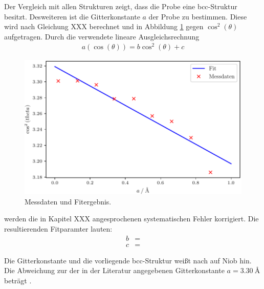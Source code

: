 Der Vergleich mit allen Strukturen zeigt, dass die Probe eine bcc-Struktur besitzt.
Desweiteren ist die Gitterkonstante $a$ der Probe zu bestimmen. Diese wird nach Gleichung XXX berechnet und in Abbildung \ref{fig:plot1} gegen $\cos^2{(\theta)}$ aufgetragen. Durch die verwendete lineare Ausgleichsrechnung
\begin{align}
	a(\cos{(\theta)})= b\cos^2{(\theta)} + c
\end{align}

\begin{figure}
  \centering
  \includegraphics{build/Metall.pdf}
  \caption{Messdaten und Fitergebnis.}
  \label{fig:plot1}
\end{figure}

werden die in Kapitel XXX angesprochenen systematischen Fehler korrigiert. Die resultierenden Fitparamter lauten:
\begin{align}
	b&=  \\
	c&= 
\end{align}

Die Gitterkonstante und die vorliegende bcc-Struktur weißt nach \cite{gitter} auf Niob hin. Die Abweichung zur der in der Literatur angegebenen Gitterkonstante
$a=\SI{3.30}{\angstrom}$ beträgt $$.





